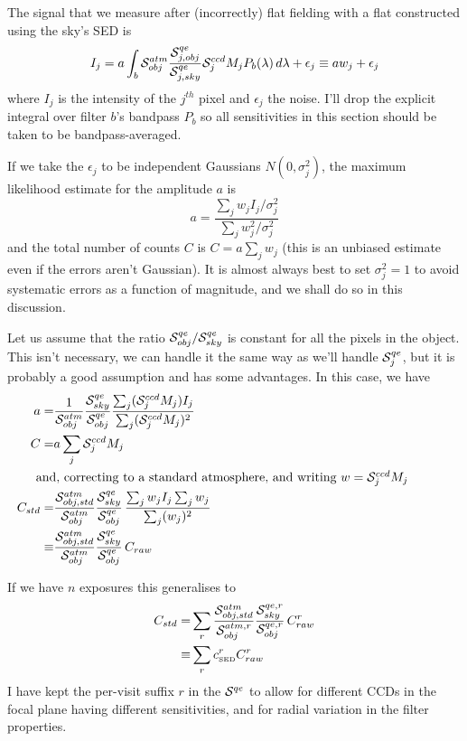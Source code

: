 \documentclass[12pt]{article}
\newcommand{\qe}{{\cal S}}
\begin{document}
The signal that we measure after (incorrectly) flat fielding with a flat constructed using the sky's SED is
$$
I_j = a \int_{b} \qe_{obj}^{atm} \frac{\qe_{j,obj}^{qe}}{\qe_{j,sky}^{qe}} \qe_j^{ccd} M_j P_b(\lambda)\, d\lambda + \epsilon_j
    \equiv a w_j + \epsilon_j
$$
where $I_j$ is the intensity of the $j^{th}$ pixel and $\epsilon_j$ the noise.  I'll drop the explicit
integral over filter $b$'s bandpass $P_b$ so all sensitivities in this section should be taken to be
bandpass-averaged.

If we take the $\epsilon_j$ to be independent Gaussians $N(0, \sigma_j^2)$, the maximum likelihood estimate
for the amplitude $a$ is
$$
a = \frac{\sum_j w_j I_j/\sigma_j^2}{\sum_j w_j^2/\sigma_j^2}
$$
and the total number of counts $C$ is $C = a\sum_j w_j$
(this is an unbiased estimate even if the errors aren't Gaussian).
It is almost always best
to set $\sigma^2_j = 1$ to avoid systematic errors as a function of magnitude, and we shall do so
in this discussion.

Let us assume that the ratio $\qe_{obj}^{qe}/\qe_{sky}^{qe}$ is constant for all the pixels in the
object.  This isn't necessary, we can handle it the same way as we'll handle $\qe_j^{qe}$, but it is probably
a good assumption and has some advantages.  In this case, we have
\begin{align*}
a =& \frac{1}{\qe_{obj}^{atm}} \frac{\qe_{sky}^{qe}}{\qe_{obj}^{qe}}
                         \frac{\sum_j (\qe_j^{ccd} M_j) I_j}{\sum_j (\qe_j^{ccd} M_j)^2}\\
C =& a \sum_j \qe_j^{ccd} M_j\\
\noalign{and, correcting to a standard atmosphere, and writing $w = \qe_j^{ccd} M_j$}
C_{std} =& \frac{\qe_{obj,std}^{atm}}{\qe_{obj}^{atm}} \frac{\qe_{sky}^{qe}}{\qe_{obj}^{qe}}
                         \, \frac{\sum_j w_j I_j  \sum_j w_j}{\sum_j (w_j)^2} \\
   \equiv& \frac{\qe_{obj,std}^{atm}}{\qe_{obj}^{atm}} \frac{\qe_{sky}^{qe}}{\qe_{obj}^{qe}}
                         \, C_{raw}
\end{align*}

\newcommand{\cSED}{c_{\scriptscriptstyle\rm SED}}

If we have $n$ exposures this generalises to
\begin{align*}
C_{std}  =& \sum_r
  \frac{\qe_{obj,std}^{atm}}{\qe_{obj}^{atm,r}} \frac{\qe_{sky}^{qe,r}}{\qe_{obj}^{qe,r}} \, C_{raw}^r\\
 \equiv& \sum_r \cSED^r C_{raw}^r
\end{align*}
I have kept the per-visit suffix $r$ in the $\qe^{qe}$ to allow for different CCDs in the focal
plane having different sensitivities, and for radial variation in the filter properties.
\end{document}
